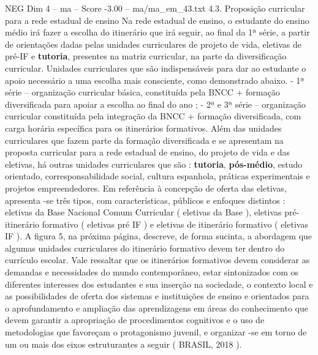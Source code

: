 \begin{textsample}{NEG Dim 4 – ma – Score -3.00 – ma/ma\_em\_43.txt}  \label{ex:f4_neg_233}
4.3.
Proposição curricular para a rede estadual de ensino Na rede estadual de ensino, o estudante do ensino médio irá fazer a escolha do itinerário que irá seguir, ao final da 1ª série, a partir de orientações dadas pelas unidades curriculares de projeto de vida, eletivas de pré-IF e \textbf{tutoria}, presentes na matriz curricular, na parte da diversificação curricular.
Unidades curriculares que são indispensáveis para dar ao estudante o apoio necessário a uma escolha mais consciente, como demonstrado abaixo. - 1ª série – organização curricular básica, constituída pela BNCC + formação diversificada para apoiar a escolha ao final do ano ; - 2ª e 3ª série – organização curricular constituída pela integração da BNCC + formação diversificada, com carga horária específica para os itinerários formativos.
Além das unidades curriculares que fazem parte da formação diversificada e se apresentam na proposta curricular para a rede estadual de ensino, do projeto de vida e das eletivas, há outras unidades curriculares que são : \textbf{tutoria}, \textbf{pós-médio}, estudo orientado, corresponsabilidade social, cultura espanhola, práticas experimentais e projetos empreendedores.
Em referência à concepção de oferta das eletivas, apresenta -se três tipos, com características, públicos e enfoques distintos : eletivas da Base Nacional Comum Curricular ( eletivas da Base ), eletivas pré-itinerário formativo ( eletivas pré IF ) e eletivas de itinerário formativo ( eletivas IF ).
A figura 5, na próxima página, descreve, de forma sucinta, a abordagem que algumas unidades curriculares do itinerário formativo devem ter dentro do currículo escolar.
Vale ressaltar que os itinerários formativos devem considerar as demandas e necessidades do mundo contemporâneo, estar sintonizados com os diferentes interesses dos estudantes e sua inserção na sociedade, o contexto local e as possibilidades de oferta dos sistemas e instituições de ensino e orientados para o aprofundamento e ampliação das aprendizagens em áreas do conhecimento que devem garantir a apropriação de procedimentos cognitivos e o uso de metodologias que favoreçam o protagonismo juvenil, e organizar -se em torno de um ou mais dos eixos estruturantes a seguir ( BRASIL, 2018 ).

\end{textsample}
